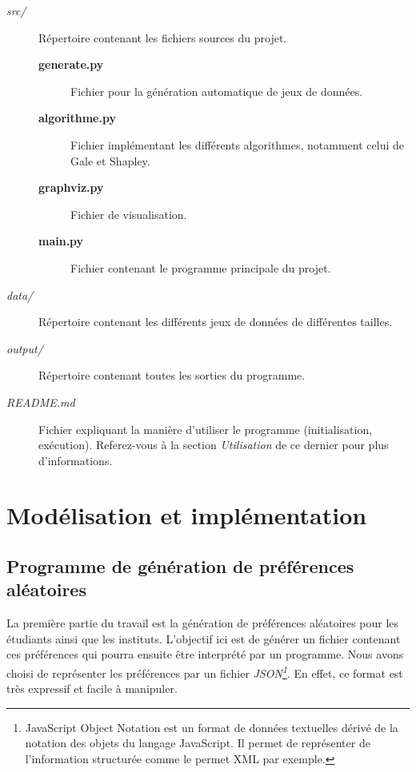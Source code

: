 \documentclass[12pt,titlepage]{article}
\begin{document}
\begin{description}

\item[\textit{src/}] Répertoire contenant les fichiers sources du projet.

\begin{description}

\item[\textbf{generate.py}] Fichier pour la génération automatique de jeux de données.

\item[\textbf{algorithme.py}] Fichier implémentant les différents algorithmes, notamment celui de Gale et Shapley.

\item[\textbf{graphviz.py}] Fichier de visualisation.

\item[\textbf{main.py}] Fichier contenant le programme principale du projet.

\end{description}

\item[\textit{data/}] Répertoire contenant les différents jeux de données de différentes tailles.

\item[\textit{output/}] Répertoire contenant toutes les sorties du programme.

\item[\textit{README.md}] Fichier expliquant la manière d'utiliser le programme (initialisation, exécution). Referez-vous à la section \textit{Utilisation} de ce dernier pour plus d'informations.

\end{description}



\section{Modélisation et implémentation}


\subsection{Programme de génération de préférences aléatoires}


La première partie du travail est la génération de préférences aléatoires pour les étudiants ainsi que les instituts. L'objectif ici est de générer un fichier contenant ces préférences qui pourra ensuite être interprété par un programme. Nous avons choisi de représenter les préférences par un fichier \textit{JSON\footnote{JavaScript Object Notation est un format de données textuelles dérivé de la notation des objets du langage JavaScript. Il permet de représenter de l’information structurée comme le permet XML par exemple.}}. En effet, ce format est très expressif et facile à manipuler.
\end{document}

